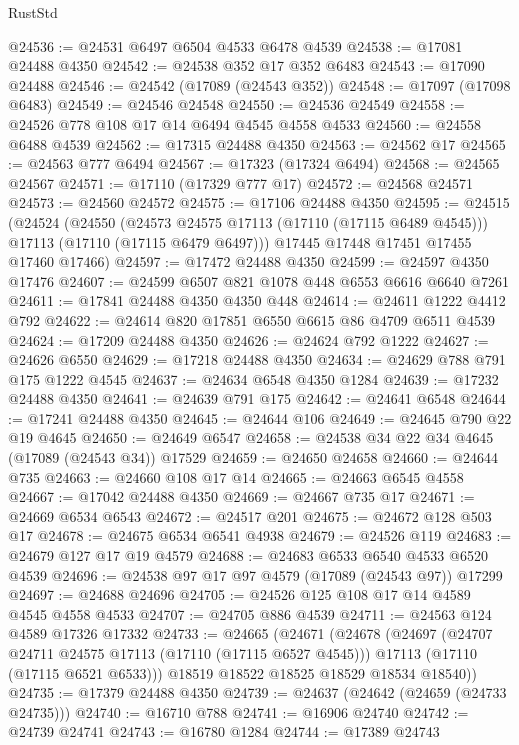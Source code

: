 \begin{lexlean}{RustStd}
\begin{coremodule}
@24536 := @24531 @6497 @6504 @4533 @6478 @4539
@24538 := @17081 @24488 @4350
@24542 := @24538 @352 @17 @352 @6483
@24543 := @17090 @24488
@24546 := @24542 (@17089 (@24543 @352))
@24548 := @17097 (@17098 @6483)
@24549 := @24546 @24548
@24550 := @24536 @24549
@24558 := @24526 @778 @108 @17 @14 @6494 @4545 @4558 @4533
@24560 := @24558 @6488 @4539
@24562 := @17315 @24488 @4350
@24563 := @24562 @17
@24565 := @24563 @777 @6494
@24567 := @17323 (@17324 @6494)
@24568 := @24565 @24567
@24571 := @17110 (@17329 @777 @17)
@24572 := @24568 @24571
@24573 := @24560 @24572
@24575 := @17106 @24488 @4350
@24595 := @24515
    (@24524
      (@24550
        (@24573 @24575 @17113 (@17110 (@17115 @6489 @4545)))
        @17113
        (@17110 (@17115 @6479 @6497)))
      @17445
      @17448
      @17451
      @17455
      @17460
      @17466)
@24597 := @17472 @24488 @4350
@24599 := @24597 @4350 @17476
@24607 := @24599 @6507 @821 @1078 @448 @6553 @6616 @6640 @7261
@24611 := @17841 @24488 @4350 @4350 @448
@24614 := @24611 @1222 @4412 @792
@24622 := @24614 @820 @17851 @6550 @6615 @86 @4709 @6511 @4539
@24624 := @17209 @24488 @4350
@24626 := @24624 @792 @1222
@24627 := @24626 @6550
@24629 := @17218 @24488 @4350
@24634 := @24629 @788 @791 @175 @1222 @4545
@24637 := @24634 @6548 @4350 @1284
@24639 := @17232 @24488 @4350
@24641 := @24639 @791 @175
@24642 := @24641 @6548
@24644 := @17241 @24488 @4350
@24645 := @24644 @106
@24649 := @24645 @790 @22 @19 @4645
@24650 := @24649 @6547
@24658 := @24538 @34 @22 @34 @4645 (@17089 (@24543 @34)) @17529
@24659 := @24650 @24658
@24660 := @24644 @735
@24663 := @24660 @108 @17 @14
@24665 := @24663 @6545 @4558
@24667 := @17042 @24488 @4350
@24669 := @24667 @735 @17
@24671 := @24669 @6534 @6543
@24672 := @24517 @201
@24675 := @24672 @128 @503 @17
@24678 := @24675 @6534 @6541 @4938
@24679 := @24526 @119
@24683 := @24679 @127 @17 @19 @4579
@24688 := @24683 @6533 @6540 @4533 @6520 @4539
@24696 := @24538 @97 @17 @97 @4579 (@17089 (@24543 @97)) @17299
@24697 := @24688 @24696
@24705 := @24526 @125 @108 @17 @14 @4589 @4545 @4558 @4533
@24707 := @24705 @886 @4539
@24711 := @24563 @124 @4589 @17326 @17332
@24733 := @24665
    (@24671
      (@24678
        (@24697
          (@24707 @24711 @24575 @17113 (@17110 (@17115 @6527 @4545)))
          @17113
          (@17110 (@17115 @6521 @6533)))
        @18519
        @18522
        @18525
        @18529
        @18534
        @18540))
@24735 := @17379 @24488 @4350
@24739 := @24637 (@24642 (@24659 (@24733 @24735)))
@24740 := @16710 @788
@24741 := @16906 @24740
@24742 := @24739 @24741
@24743 := @16780 @1284
@24744 := @17389 @24743

\end{coremodule}
\end{lexlean}
